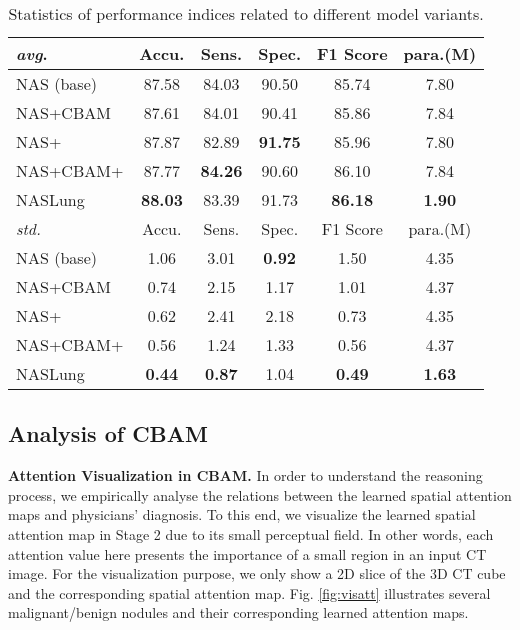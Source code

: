 \documentclass[final,5p,times,twocolumn]{elsarticle}
\begin{document}
\begin{table*}
\centering
\caption{Statistics of performance indices related to different model variants.}
\small
\label{tab:ablation}
\begin{tabular}{l|ccccc}
\toprule
\textit{avg}. & Accu.	& Sens.	& Spec.	& F1 Score & para.(M) \\
\midrule
NAS (base)	&	87.58 	&	84.03 	&	90.50 	&	85.74 	&	7.80 	\\
NAS+CBAM	&	87.61 	&	84.01 	&	90.41 	&	85.86 	&	7.84 	\\
NAS+	&	87.87 	&	82.89 	&	\textbf{91.75} 	&	85.96 	&	7.80 	\\
NAS+CBAM+	&	87.77 	&	\textbf{84.26 }	&	90.60 	&	86.10 	&	7.84 	\\
NASLung	&	\textbf{88.03} 	&	83.39 	&	91.73 	&	\textbf{86.18} 	&	\textbf{1.90}	\\
\bottomrule \toprule
\textit{std.} & Accu.	& Sens.	& Spec.	& F1 Score & para.(M) \\
\midrule
NAS (base)	&	1.06 	&	3.01 	&	\textbf{0.92} 	&	1.50 	&	4.35 	\\
NAS+CBAM	&	0.74 	&	2.15 	&	1.17 	&	1.01 	&	4.37 	\\
NAS+	&	0.62 	&	2.41 	&	2.18 	&	0.73 	&	4.35 	\\
NAS+CBAM+	&	0.56 	&	1.24 	&	1.33 	&	0.56 	&	4.37 	\\
NASLung	&	\textbf{0.44} 	&	\textbf{0.87} 	&	1.04 	&	\textbf{0.49} 	&	\textbf{1.63} 	\\
\bottomrule												
\end{tabular}
\end{table*}


\subsection{Analysis of CBAM}
\label{ssec:exp_cbam}

\textbf{Attention Visualization in CBAM.} 
In order to understand the reasoning process, we empirically analyse the relations between the learned spatial attention maps and physicians' diagnosis. To this end, we visualize the learned spatial attention map in Stage 2 due to its small perceptual field. In other words, each attention value here presents the importance of a small region in an input CT image. For the visualization purpose, we only show a 2D slice of the 3D CT cube and the corresponding spatial attention map. 
Fig. \ref{fig:visatt} illustrates several malignant/benign nodules and their corresponding learned attention maps. 
\end{document}
